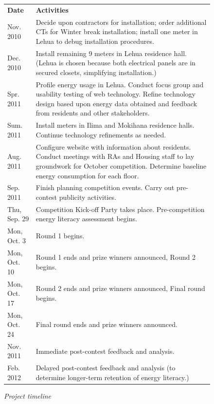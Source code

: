 \documentclass[11pt]{article}
\begin{document}
\begin{figure}[!ht]
\small
\begin{tabular}{p{1in}p{5in}} \hline
{\bf Date} & {\bf Activities}  \\
Nov. 2010 &  Decide upon contractors for installation; order additional CTs for Winter break installation; install one meter in Lehua to debug installation procedures.  \\

Dec. 2010 & Install remaining 9 meters in Lehua residence hall.  (Lehua is chosen because both electrical panels are in secured closets, simplifying installation.) \\

Spr. 2011 &  Profile energy usage in Lehua. Conduct focus group and usability testing of web technology.  Refine technology design based upon energy data obtained and feedback from residents and other stakeholders.  \\

Sum. 2011 & Install meters in Ilima and Mokihana residence halls.  Continue technology refinements as needed. \\

Aug. 2011  & Configure website with information about residents.  Conduct meetings with RAs and Housing staff to lay groundwork for October competition. Determine baseline energy consumption for each floor.\\

Sep. 2011 & Finish planning competition events.  Carry out pre-contest publicity activities.   \\

Thu, Sep. 29 & Competition Kick-off Party takes place.  Pre-competition energy literacy assessment begins. \\

Mon, Oct. 3 & Round 1 begins. \\

Mon, Oct. 10 & Round 1 ends and prize winners announced, Round 2 begins. \\

Mon, Oct. 17 & Round 2 ends and prize winners announced, Final round begins. \\

Mon, Oct. 24 & Final round ends and prize winners announced.  \\

Nov. 2011 &  Immediate post-contest feedback and analysis.  \\

Feb. 2012 &  Delayed post-contest feedback and analysis (to determine longer-term retention of energy literacy.)  \\ \hline
\end{tabular} 
\normalsize
\caption{{\em Project timeline}}
\label{fig:timeline}
\end{figure}
\end{document}
